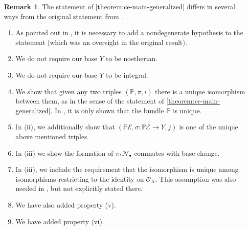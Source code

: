 \documentclass[12 pt]{amsart}
\theoremstyle{plain}
\theoremstyle{definition}
\newtheorem{remark}[theorem]{Remark}
\theoremstyle{remark}
\numberwithin{equation}{section}
\newcommand\bp{\mathbb P}
\newcommand\sce{\mathscr E}
\begin{document}
\begin{remark}
	\label{remark:ce-improvements}
	The statement of 
	\autoref{theorem:ce-main-generalized}
	differs in several ways from the original statement \cite[Thm.
	2.1]{casnatiE:covers-algebraic-varieties} from
	\cite{casnatiE:covers-algebraic-varieties}.

	\begin{enumerate}
		\item As pointed out in \cite[Thm. 2.2]{casnatiN:on-some-gorenstein-loci}, it is necessary to add a nondegenerate hypothesis to the statement (which was an oversight in the original result).
		\item We  do not require our base $Y$ to be noetherian.
		\item We do not require our base $Y$ to be integral.
\item	We show that given any two triples $(\mathbb P, \pi, i)$ there
	is a unique isomorphism between them, as in
	the sense of the statement of \autoref{theorem:ce-main-generalized}. In
	\cite[Thm. 2.1]{casnatiE:covers-algebraic-varieties}, it is only shown
	that the bundle $\mathbb P$ is unique.
\item In (ii), we additionally show that $(\bp \sce, \sigma: \bp \sce \to Y, j)$
	is one of the unique above mentioned triples.
\item In (iii) we show the formation of $\pi_* \mathscr N_\bullet$ commutes with
	base change.
\item In (iii), we include the requirement that the isomorphism is unique among
	isomorphisms restricting to the identity on $\mathscr O_X$. This
	assumption was also needed in
	\cite{casnatiE:covers-algebraic-varieties}, but not explicitly stated
	there.
\item	We have also added property (v).
\item We have added property (vi).
	\end{enumerate}
\end{remark}
\end{document}
